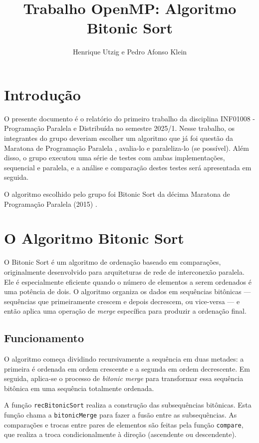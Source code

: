 \documentclass{article}
\title{Trabalho OpenMP: Algoritmo Bitonic Sort}
\author{Henrique Utzig e Pedro Afonso Klein}
\begin{document}
\maketitle

\section{Introdução}

O presente documento é o relatório do primeiro trabalho da disciplina INF01008 - Programação Paralela e Distribuída no semestre 2025/1. Nesse trabalho, os integrantes do grupo deveriam escolher um algoritmo que já foi questão da Maratona de Programação Paralela \cite{MPP}, avalia-lo e paraleliza-lo (se possível). Além disso, o grupo executou uma série de testes com ambas implementações, sequencial e paralela, e a análise e comparação destes testes será apresentada em seguida.

O algoritmo escolhido pelo grupo foi Bitonic Sort da décima Maratona de Programação Paralela (2015) \cite{BitonicSort}.

\section{O Algoritmo Bitonic Sort}

O Bitonic Sort é um algoritmo de ordenação baseado em comparações, originalmente desenvolvido para arquiteturas de rede de interconexão paralela. Ele é especialmente eficiente quando o número de elementos a serem ordenados é uma potência de dois. O algoritmo organiza os dados em sequências bitônicas — sequências que primeiramente crescem e depois decrescem, ou vice-versa — e então aplica uma operação de \textit{merge} específica para produzir a ordenação final.

\subsection{Funcionamento}

O algoritmo começa dividindo recursivamente a sequência em duas metades: a primeira é ordenada em ordem crescente e a segunda em ordem decrescente. Em seguida, aplica-se o processo de \textit{bitonic merge} para transformar essa sequência bitônica em uma sequência totalmente ordenada.

A função \texttt{recBitonicSort} realiza a construção das subsequências bitônicas. Esta função chama a \texttt{bitonicMerge} para fazer a fusão entre as subsequências. As comparações e trocas entre pares de elementos são feitas pela função \texttt{compare}, que realiza a troca condicionalmente à direção (ascendente ou descendente).
\end{document}
